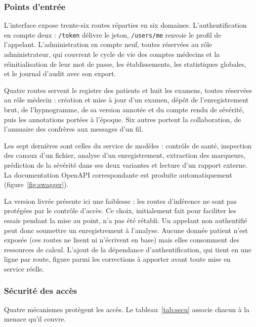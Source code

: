 \subsubsection{Points d'entrée}

L'interface expose trente-six routes réparties en six domaines. L'authentification en
compte deux : \texttt{/token} délivre le jeton, \texttt{/users/me} renvoie le profil de
l'appelant. L'administration en compte neuf, toutes réservées au rôle administrateur,
qui couvrent le cycle de vie des comptes médecins et la réinitialisation de leur mot de
passe, les établissements, les statistiques globales, et le journal d'audit avec son
export.

Quatre routes servent le registre des patients et huit les examens, toutes réservées au
rôle médecin : création et mise à jour d'un examen, dépôt de l'enregistrement brut, de
l'hypnogramme, de sa version annotée et du compte rendu de sévérité, puis les
annotations portées à l'époque. Six autres portent la collaboration, de l'annuaire des
confrères aux messages d'un fil.

Les sept dernières sont celles du service de modèles : contrôle de santé, inspection des
canaux d'un fichier, analyse d'un enregistrement, extraction des marqueurs, prédiction de
la sévérité dans ses deux variantes et lecture d'un rapport externe. La documentation
OpenAPI correspondante est produite automatiquement (figure~\ref{fig:swagger}).

La version livrée présente ici une faiblesse : les routes d'inférence
ne sont pas protégées par le contrôle d'accès. Ce choix, initialement fait pour faciliter
les essais pendant la mise au point, n'a pas été rétabli. Un appelant non authentifié peut
donc soumettre un enregistrement à l'analyse. Aucune donnée patient n'est exposée (ces
routes ne lisent ni n'écrivent en base) mais elles consomment des ressources de calcul.
L'ajout de la dépendance d'authentification, qui tient en une ligne par route, figure parmi
les corrections à apporter avant toute mise en service réelle.


\subsubsection{Sécurité des accès}

Quatre mécanismes protègent les accès. Le tableau~\ref{tab:secu} associe chacun à la menace
qu'il couvre.

